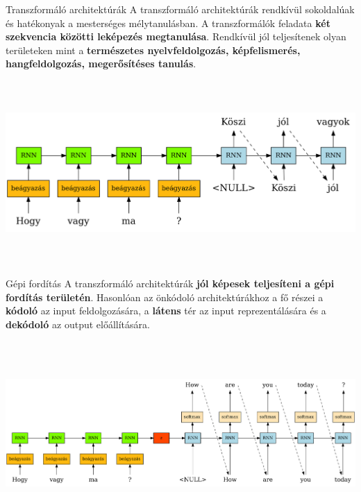 \documentclass[english, aspectratio=169]{beamer}
\begin{document}
\begin{frame}{Transzformáló architektúrák}
A transzformáló architektúrák rendkívül sokoldalúak és hatékonyak a mesterséges mélytanulásban. A transzformálók feladata \textbf{két szekvencia közötti leképezés megtanulása}. Rendkívül jól teljesítenek olyan területeken mint a \textbf{természetes nyelvfeldolgozás, képfelismerés, hangfeldolgozás, megerősítéses tanulás}.
\begin{center}
\includegraphics[width=14cm, height=7cm, keepaspectratio]{graphs/transformer_1.png}
\end{center}
\end{frame}

\begin{frame}{Gépi fordítás}
A transzformáló architektúrák \textbf{jól képesek teljesíteni a gépi fordítás területén}. Hasonlóan az önkódoló architektúrákhoz a fő részei a \textbf{kódoló} az input feldolgozására, a \textbf{látens} tér az input reprezentálására és a \textbf{dekódoló} az output előállítására. 
\begin{center}
\includegraphics[width=14cm, height=7cm, keepaspectratio]{graphs/transformer_2.png}
\end{center}
\end{frame}
\end{document}
